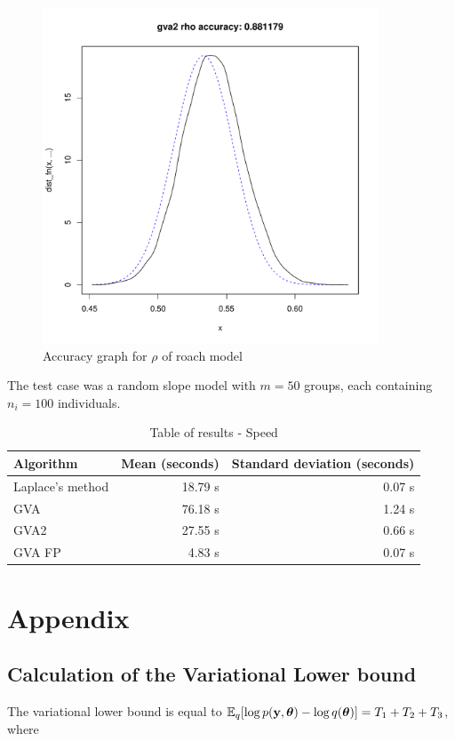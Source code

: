 \documentclass{article}[12pt]
\begin{document}
\begin{figure}
\caption{Accuracy graph for $\rho$ of roach model}
\label{fig:accuracy_roach_rho}
\includegraphics[width=100mm, height=100mm]{code/results/17_accuracy_plots_application_gva2.pdf}
\end{figure}

The test case was a random slope model with $m=50$ groups, each containing $n_i = 100$ individuals.

\begin{table}
\caption{Table of results - Speed}
\label{tab:application_slope_speed}
\begin{tabular}{|l|rr|}
\hline
Algorithm & Mean (seconds) & Standard deviation (seconds) \\
\hline
Laplace's method & 18.79 s & 0.07 s \\
GVA & 76.18 s & 1.24 s \\
GVA2 & 27.55 s & 0.66 s \\
GVA FP & 4.83 s & 0.07 s \\
\hline
\end{tabular}
\end{table}


\newpage
\section{Appendix} 
\subsection{Calculation of the Variational Lower bound}
The variational lower bound is equal to
${\mathbb E}_q[\log{p({\bf y}, {\boldsymbol\theta})} - \log{q({\boldsymbol\theta})}] = T_1 + T_2 + T_3$,
where
\end{document}
